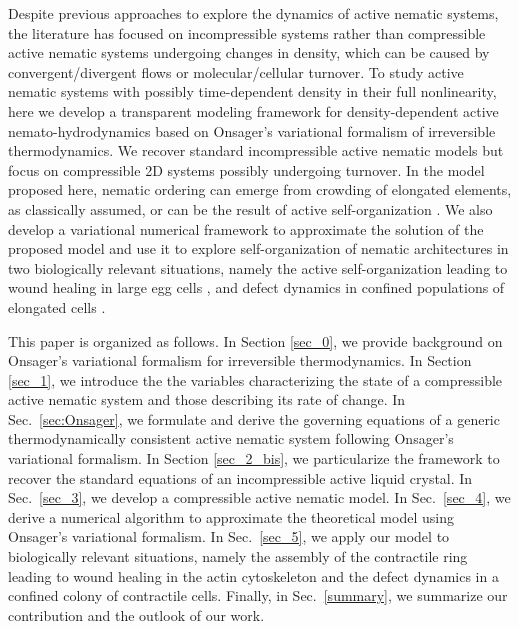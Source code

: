 \documentclass[12pt]{iopart}
\begin{document}
	Despite previous approaches to explore the dynamics of active nematic systems, the literature has focused on incompressible systems rather than compressible active nematic systems undergoing changes in density, which can be caused by convergent/divergent flows or molecular/cellular turnover. To study active nematic systems with possibly time-dependent density in their full nonlinearity, here we develop a transparent modeling framework for density-dependent active nemato-hydrodynamics based on Onsager's variational formalism of irreversible thermodynamics. %
	We recover standard incompressible active nematic models but focus on compressible 2D systems possibly undergoing turnover. In the model proposed here, nematic ordering can emerge from crowding of elongated elements, as classically assumed, or can be the result of active self-organization \cite{mirza2022}. We also develop a variational numerical framework to approximate the solution of the proposed model and use it to explore self-organization of nematic architectures in two biologically  relevant situations, namely the active self-organization leading to wound healing in large egg cells \cite{benink2000,mandato2001}, and defect dynamics in confined populations of elongated cells \cite{duclos2014}. 
	
	
	This paper is organized as follows. In Section \ref{sec_0}, we provide background on Onsager's variational formalism for irreversible thermodynamics. In Section \ref{sec_1}, we introduce the the variables characterizing the state of a compressible active nematic system and those describing its rate of change. In Sec.~\ref{sec:Onsager}, we formulate and derive the governing equations of a generic thermodynamically consistent active nematic system following Onsager's variational formalism. In Section \ref{sec_2_bis}, we particularize the framework to recover the standard equations of an incompressible active liquid crystal. In Sec.~\ref{sec_3}, we develop a compressible active nematic model. In Sec.~\ref{sec_4}, we derive a numerical algorithm to approximate the theoretical model using Onsager's variational formalism. In Sec.~\ref{sec_5}, we apply our model to biologically relevant situations, namely the assembly of the contractile ring leading to wound healing in the actin cytoskeleton and the defect dynamics in a confined colony of contractile cells. Finally, in Sec.~\ref{summary}, we summarize our contribution and the outlook of our work. 
	
\end{document}
